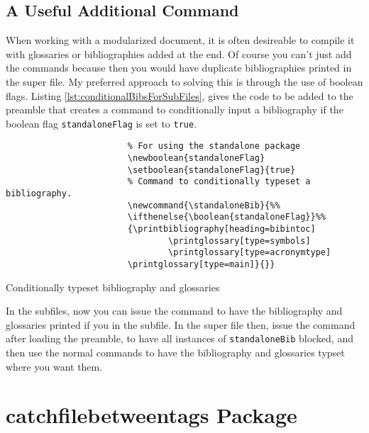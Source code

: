 \documentclass[hidelinks]{article}
\begin{document}
        \subsection{A Useful Additional Command}
            When working with a modularized document, it is often desireable to compile it with glossaries or bibliographies added at the end.
            Of course you can't just add the commands \texttt{\printbibliography} because then you would have duplicate bibliographies printed in the super file.
            My preferred approach to solving this is through the use of boolean flags.
            Listing \ref{lst:conditionalBibsForSubFiles}, gives the code to be added to the preamble that creates a command to conditionally input a bibliography if the boolean flag \texttt{standaloneFlag} is set to \texttt{true}.
            \begin{listing}[H]
                \begin{centering}
                    \begin{verbatim}
                        % For using the standalone package
                        \newboolean{standaloneFlag}
                        \setboolean{standaloneFlag}{true}
                        % Command to conditionally typeset a bibliography.
                        \newcommand{\standaloneBib}{%%
                        \ifthenelse{\boolean{standaloneFlag}}%%
                        {\printbibliography[heading=bibintoc]
                                \printglossary[type=symbols]
                                \printglossary[type=acronymtype]
                        \printglossary[type=main]}{}}
                    \end{verbatim}
                    \caption{Conditionally typeset bibliography and glossaries}
                    \label{lst:conditionalBibsForSubFiles}
                \end{centering}
            \end{listing}
            In the subfiles, now you can issue the command \texttt{\standaloneBib} to have the bibliography and glossaries printed if you in the subfile.
            In the super file then, issue the command \texttt{} after loading the preamble, to have all instances of \texttt{standaloneBib} blocked, and then use the normal commands to have the bibliography and glossaries typset where you want them.


    \section{catchfilebetweentags Package}
\end{document}
